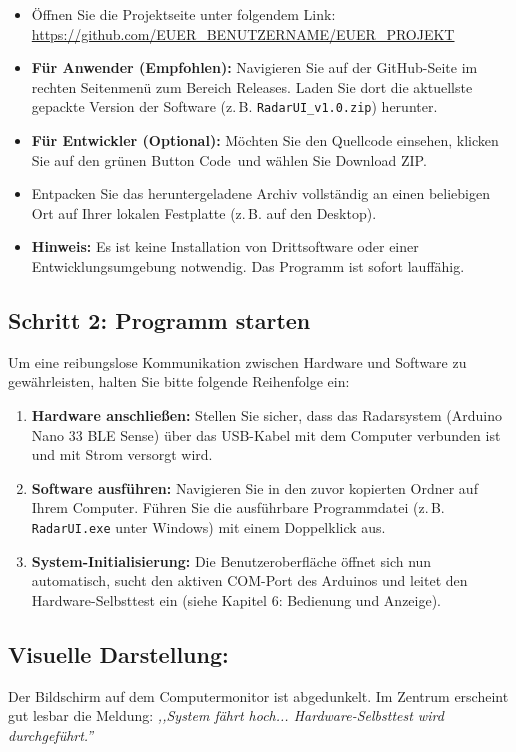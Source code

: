 \begin{itemize}
	\item Öffnen Sie die Projektseite unter folgendem Link: \\ \url{https://github.com/EUER_BENUTZERNAME/EUER_PROJEKT} %
	\item \textbf{Für Anwender (Empfohlen):} Navigieren Sie auf der GitHub-Seite im rechten Seitenmenü zum Bereich \glqq Releases\grqq. Laden Sie dort die aktuellste gepackte Version der Software (z.\,B. \texttt{RadarUI\_v1.0.zip}) herunter.
	\item \textbf{Für Entwickler (Optional):} Möchten Sie den Quellcode einsehen, klicken Sie auf den grünen Button \glqq Code\grqq~und wählen Sie \glqq Download ZIP\grqq.
	\item Entpacken Sie das heruntergeladene Archiv vollständig an einen beliebigen Ort auf Ihrer lokalen Festplatte (z.\,B. auf den Desktop).
	\item \textbf{Hinweis:} Es ist keine Installation von Drittsoftware oder einer Entwicklungsumgebung  notwendig. Das Programm ist sofort lauffähig.
\end{itemize}

\subsection*{Schritt 2: Programm starten}
Um eine reibungslose Kommunikation zwischen Hardware und Software zu gewährleisten, halten Sie bitte folgende Reihenfolge ein:

\begin{enumerate}
	\item \textbf{Hardware anschließen:} Stellen Sie sicher, dass das Radarsystem (Arduino Nano 33 BLE Sense) über das USB-Kabel mit dem Computer verbunden ist und mit Strom versorgt wird.
	\item \textbf{Software ausführen:} Navigieren Sie in den zuvor kopierten Ordner auf Ihrem Computer. Führen Sie die ausführbare Programmdatei (z.\,B. \texttt{RadarUI.exe} unter Windows) mit einem Doppelklick aus.
	\item \textbf{System-Initialisierung:} Die Benutzeroberfläche öffnet sich nun automatisch, sucht den aktiven COM-Port des Arduinos und leitet den Hardware-Selbsttest ein (siehe Kapitel 6: Bedienung und Anzeige).
\end{enumerate}

\subsection{Visuelle Darstellung:} 
Der Bildschirm auf dem Computermonitor ist abgedunkelt. Im Zentrum erscheint gut lesbar die Meldung: \textit{,,System fährt hoch... Hardware-Selbsttest wird durchgeführt.''}

